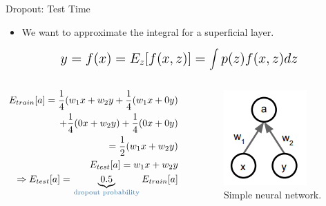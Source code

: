 \begin{frame}{Dropout: Test Time}
	\begin{itemize}
		\item We want to approximate the integral for a superficial layer.
	\end{itemize}
	\begin{equation*}
		\mathlarger{\mathlarger{
			y = f(x) = E_z[f(x, z)] = \int p(z)f(x, z) dz
		}}
	\end{equation*}
	\begin{columns}
		\begin{column}{0.5\textwidth}
			\begin{align*}
				E_{train}[a] = \frac{1}{4}(w_1 x + w_2 y
				+ \frac{1}{4}(w_1 x + 0 y) \\
				+ \frac{1}{4}(0 x + w_2 y) + \frac{1}{4}(0 x + 0 y) \\
				= \frac{1}{2}(w_1 x + w_2 y) \\
				E_{test}[a] = w_1 x + w_2 y \\
				\Rightarrow E_{test}[a] = \underbrace{0.5}_{\text{\tc{keywords}{dropout probability}}} E_{train}[a]
			\end{align*}
		\end{column}
		\begin{column}{0.5\textwidth}
			\begin{figure}[H]
				\centering
				\includegraphics[height=0.4\textheight]{Figs/section_4/dropout_test.png}
				\caption{Simple neural network. \cite{cs231n-2018-lecture7}}
			\end{figure}
		\end{column}
	\end{columns}
\end{frame}




